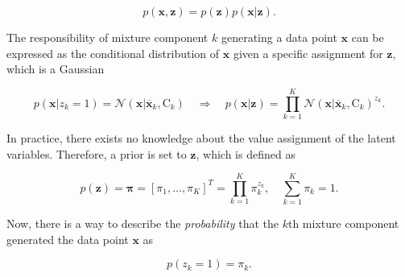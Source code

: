 \documentclass[../../../main.tex]{subfiles}
\begin{document}
\begin{equation}\label{eq:joint_lat_var}
    p(\bm{x},\bm{z}) = p(\bm{z})p(\bm{x}|\bm{z}).
\end{equation}

The responsibility of mixture component $k$ generating a data point $\bm{x}$ can be expressed as the conditional distribution of $\bm{x}$ given a specific assignment for $\bm{z}$, which is a Gaussian

\begin{equation}\label{eq:cond_lat_var}
    p(\bm{x} | z_k=1) = \mathcal{N}(\bm{x} | \overline{\bm{x}}_k, \bm{\mathrm{C}}_k) \quad \Rightarrow \quad p(\bm{x}|\bm{z}) = \prod\limits^K_{k=1}\mathcal{N}(\bm{x} | \overline{\bm{x}}_k, \bm{\mathrm{C}}_k)^{z_k} .
\end{equation}

In practice, there exists no knowledge about the value assignment of the latent variables. Therefore, a prior is set to $\bm{z}$, which is defined as

\begin{equation}\label{eq:prior_lat_var}
    p(\bm{z})=\bm{\pi}=[\pi_{1}, \dots, \pi_{K}]^T = \prod\limits^K_{k=1}\pi_k^{z_k}, \quad \sum\limits_{k=1}^K\pi_{k}=1.
\end{equation}

Now, there is a way to describe the \textit{probability} that the $k$th mixture component generated the data point $\bm{x}$ as

\begin{equation}
    p(z_k=1)=\pi_k.
\end{equation}

%     
%     
\end{document}
